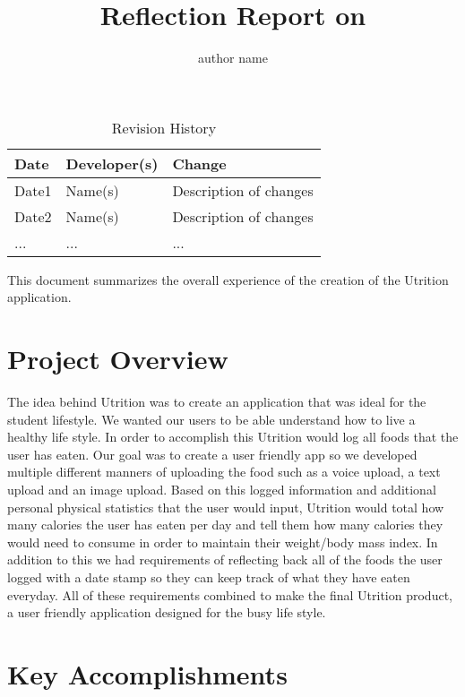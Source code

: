\documentclass{article}
\title{Reflection Report on \progname}
\author{author name}
\date{}
\begin{document}
\begin{table}[hp]
\caption{Revision History} \label{TblRevisionHistory}
\begin{tabularx}{\textwidth}{llX}
\toprule
\textbf{Date} & \textbf{Developer(s)} & \textbf{Change}\\
\midrule
Date1 & Name(s) & Description of changes\\
Date2 & Name(s) & Description of changes\\
... & ... & ...\\
\bottomrule
\end{tabularx}
\end{table}

\newpage

\maketitle

This document summarizes the overall experience of the creation of the Utrition application. 

\section{Project Overview}


The idea behind Utrition was to create an application that was ideal for the student lifestyle. We wanted our users to be able understand how to live a healthy life style. In order to accomplish this Utrition would log all foods that the user has eaten. Our goal was to create a user friendly app so we developed multiple different manners of uploading the food such as a voice upload, a text upload and an image upload. Based on this logged information and additional personal physical statistics that the user would input, Utrition would total how many calories the user has eaten per day and tell them how many calories they would need to consume in order to maintain their weight/body mass index. In addition to this we had requirements of reflecting back all of the foods the user logged with a date stamp so they can keep track of what they have eaten everyday. All of these requirements combined to make the final Utrition product, a user friendly application designed for the busy life style.


\section{Key Accomplishments}
\end{document}
